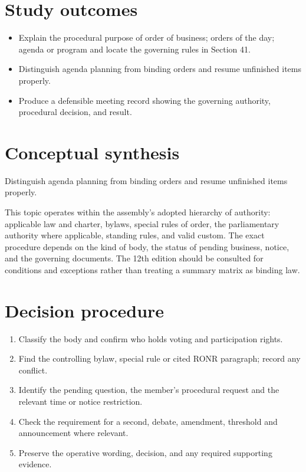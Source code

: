 \documentclass[11pt]{article}
\begin{document}
\SuiteOpen
{}
\section{Study outcomes}
\begin{itemize}[leftmargin=*,itemsep=4pt]
\item Explain the procedural purpose of order of business; orders of the day; agenda or program and locate the governing rules in Section 41.
\item Distinguish agenda planning from binding orders and resume unfinished items properly.
\item Produce a defensible meeting record showing the governing authority, procedural decision, and result.
\end{itemize}

\section{Conceptual synthesis}
Distinguish agenda planning from binding orders and resume unfinished items properly.

This topic operates within the assembly’s adopted hierarchy of authority: applicable law and charter, bylaws, special rules of order, the parliamentary authority where applicable, standing rules, and valid custom. The exact procedure depends on the kind of body, the status of pending business, notice, and the governing documents. The 12th edition should be consulted for conditions and exceptions rather than treating a summary matrix as binding law.
\section{Decision procedure}
\begin{enumerate}[leftmargin=*,itemsep=4pt]
\item Classify the body and confirm who holds voting and participation rights.
\item Find the controlling bylaw, special rule or cited RONR paragraph; record any conflict.
\item Identify the pending question, the member’s procedural request and the relevant time or notice restriction.
\item Check the requirement for a second, debate, amendment, threshold and announcement where relevant.
\item Preserve the operative wording, decision, and any required supporting evidence.
\end{enumerate}
\end{document}
